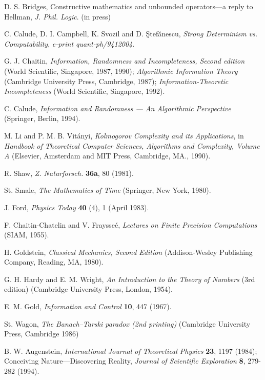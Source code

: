 \begin{thebibliography}{99}
D. S. Bridges, Constructive mathematics and unbounded operators---a
reply to Hellman,
{\it J. Phil. Logic}. (in press)

C. Calude,
D. I. Campbell,
 K. Svozil and
D. \c{S}tef\u anescu,
{\sl Strong Determinism vs.  Computability},
{\it  e-print quant-ph/9412004}.

G. J. Chaitin, {\sl Information, Randomness and Incompleteness, Second
edition}
(World Scientific, Singapore, 1987, 1990);
{\sl Algorithmic Information Theory}
(Cambridge University Press, Cambridge, 1987);
{\sl Information-Theoretic Incompleteness}
(World Scientific, Singapore, 1992).

 C. Calude,
{\sl Information and Randomness --- An Algorithmic Perspective}
(Springer, Berlin,
1994).

 M. Li and P. M. B. Vit\'{a}nyi, {\sl Kolmogorov Complexity and its
 Applications}, in {\sl Handbook of Theoretical Computer Sciences,
  Algorithms and Complexity, Volume A}
 (Elsevier, Amsterdam and MIT Press, Cambridge, MA., 1990).


 R. Shaw, {\sl Z. Naturforsch.} {\bf 36a}, 80 (1981).

St. Smale, {\sl The Mathematics of Time} (Springer, New York, 1980).

 J. Ford, {\sl Physics Today} {\bf 40} (4), 1 (April 1983).

F. Chaitin-Chatelin and V. Fraysse\'{e},
{\sl Lectures on Finite Precision Computations}
(SIAM, 1955).

H. Goldstein,
{\sl Classical Mechanics, Second Edition}
(Addison-Wesley Publishing Company, Reading, MA, 1980).

 G. H. Hardy and E. M. Wright, {\sl An Introduction to the Theory of
 Numbers} (3rd edition) (Cambridge University Press, London, 1954).

 E. M. Gold, {\sl Information and Control} {\bf 10}, 447 (1967).

St. Wagon, {\sl The Banach--Tarski paradox (2nd printing)}
(Cambridge University Press, Cambridge 1986)

 B. W. Augenstein, {\sl International Journal of Theoretical Physics}
 {\bf 23}, 1197 (1984); Conceiving Nature---Discovering Reality, {\sl
Journal of Scientific Exploration} {\bf 8}, 279-282 (1994).


\end{thebibliography}
